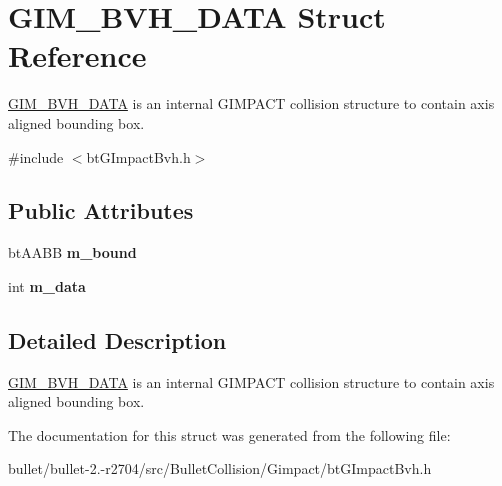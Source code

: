\hypertarget{struct_g_i_m___b_v_h___d_a_t_a}{\section{G\+I\+M\+\_\+\+B\+V\+H\+\_\+\+D\+A\+T\+A Struct Reference}
\label{struct_g_i_m___b_v_h___d_a_t_a}
}


\hyperlink{struct_g_i_m___b_v_h___d_a_t_a}{G\+I\+M\+\_\+\+B\+V\+H\+\_\+\+D\+A\+T\+A} is an internal G\+I\+M\+P\+A\+C\+T collision structure to contain axis aligned bounding box.  




{\ttfamily \#include $<$bt\+G\+Impact\+Bvh.\+h$>$}

\subsection*{Public Attributes}
\begin{DoxyCompactItemize}
\item 
\hypertarget{struct_g_i_m___b_v_h___d_a_t_a_af76e5bb8f71d46972230416e53d0334f}{bt\+A\+A\+B\+B {\bfseries m\+\_\+bound}}\label{struct_g_i_m___b_v_h___d_a_t_a_af76e5bb8f71d46972230416e53d0334f}

\item 
\hypertarget{struct_g_i_m___b_v_h___d_a_t_a_ae16784b51d90513673f6ab4dd8c5ee1b}{int {\bfseries m\+\_\+data}}\label{struct_g_i_m___b_v_h___d_a_t_a_ae16784b51d90513673f6ab4dd8c5ee1b}

\end{DoxyCompactItemize}


\subsection{Detailed Description}
\hyperlink{struct_g_i_m___b_v_h___d_a_t_a}{G\+I\+M\+\_\+\+B\+V\+H\+\_\+\+D\+A\+T\+A} is an internal G\+I\+M\+P\+A\+C\+T collision structure to contain axis aligned bounding box. 

The documentation for this struct was generated from the following file\+:\begin{DoxyCompactItemize}
\item 
bullet/bullet-\/2.-\/r2704/src/\+Bullet\+Collision/\+Gimpact/bt\+G\+Impact\+Bvh.\+h\end{DoxyCompactItemize}
